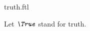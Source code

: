 \documentclass{stex}
\begin{document}
\begin{smodule}{truth.ftl}


\begin{fakeforthel}
  \begin{convention}[for=True]
    Let $\emph{\True}$ stand for truth.
  \end{convention}
\end{fakeforthel}

\end{smodule}
\end{document}
